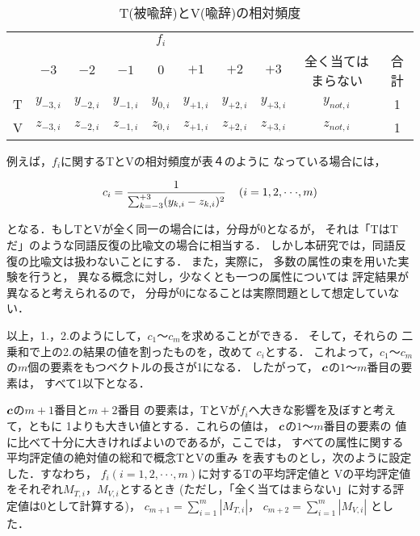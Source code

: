 \begin{table}[h] 
\caption{T(被喩辞)とV(喩辞)の相対頻度}
\label{tbl:hyo4}
\begin{center}

\begin{tabular}{l|ccccccccc}
 \hline
 & \multicolumn{7}{c}{$f_i$} \\
 \cline{2-10}
 & $-3$ & $-2$ & $-1$ & $0$ & $+1$ & $+2$ & $+3$ & 全く当てはまらない & 合計 \\  
 \hline
  T   & $y_{-3,i}$ & $y_{-2,i}$ & $y_{-1,i}$ & $y_{0,i}$ & $y_{+1,i}$ &
$y_{+2,i}$ & $y_{+3,i}$ & $y_{not,i}$ & 1 \\
  V   & $z_{-3,i}$ & $z_{-2,i}$ & $z_{-1,i}$ & $z_{0,i}$ & $z_{+1,i}$ &
$z_{+2,i}$ & $z_{+3,i}$ & $z_{not,i}$ & 1 \\
  \hline
\end{tabular}

\end{center}
\end{table}



\noindent 例えば，$f_i$に関するTとVの相対頻度が表４のように
なっている場合には， 

\[c_i=\frac{1}{\sum_{k=-3}^{+3}(y_{k,i}-z_{k,i})^2}\hspace{0.4cm}(i=1,2,\cdot\cdot\cdot,m)\]

\noindent となる．もしTとVが全く同一の場合には，分母が0となるが，
それは「TはTだ」のような同語反復の比喩文の場合に相当する．
しかし本研究では，同語反復の比喩文は扱わないことにする．
また，実際に，
多数の属性の束を用いた実験を行うと，
異なる概念に対し，少なくとも一つの属性については
評定結果が異なると考えられるので，
分母が0になることは実際問題として想定していない．

以上，1.，2.のようにして，$c_1$〜$c_m$を求めることができる．
そして，それらの
二乗和で上の2.の結果の値を割ったものを，改めて
$c_i$とする．
これよって，$c_1$〜$c_m$の$m$個の要素\mbox{をもつベク}トルの長さが1になる．
したがって，
$\mbox{\boldmath $c$}$\hspace{0.1cm}の$1$〜$m$番目の要素は，
すべて1以下となる．


$\mbox{\boldmath $c$}$\hspace{0.1cm}の$m+1$番目と$m+2$番目
の要素は，TとVが$f_i$へ大きな影響を及ぼすと考えて，ともに
1よりも大きい値とする．これらの値は，
$\mbox{\boldmath $c$}$\hspace{0.1cm}の$1$〜$m$番目の要素の
値に比べて十分に大きければよいのであるが，ここでは，
すべての属性に関する平均評定値の絶対値の総和で概念TとVの重み
を表すものとし，次のように設定した．すなわち，
$f_i(i=1,2,\cdot\cdot\cdot,m)$に対するTの平均評定値と
Vの平均評定値をそれぞれ$M_{T,i}$，$M_{V,i}$とするとき
(ただし，「全く当てはまらない」に対する評定値は0として計算する)，
$c_{m+1}={\sum_{i=1}^m|M_{T,i}|}$，
$c_{m+2}={\sum_{i=1}^m|M_{V,i}|}$
とした．

